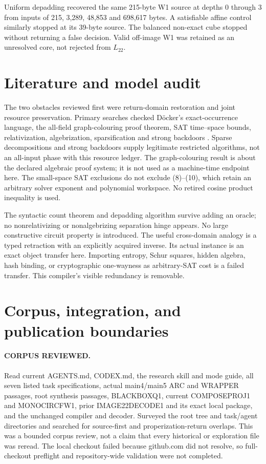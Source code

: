 \documentclass[11pt]{article}
\begin{document}
Uniform depadding recovered the same 215-byte W1 source at depths 0 through 3
from inputs of 215, 3,289, 48,853 and 698,617 bytes. A satisfiable affine
control similarly stopped at its 39-byte source. The balanced non-exact cube
stopped without returning a false decision. Valid off-image W1 was retained
as an unresolved core, not rejected from $L_{22}$.

\section{Literature and model audit}
The two obstacles reviewed first were return-domain restoration and joint
resource preservation. Primary searches checked D\"ocker's exact-occurrence
language, the all-field graph-colouring proof theorem, SAT time--space bounds,
relativization, algebrization, sparsification and strong backdoors
\cite{docker,colour,mw,bgs,aw,ipz,gs}. Sparse decompositions and strong
backdoors supply legitimate restricted algorithms, not an all-input phase
with this resource ledger. The graph-colouring result is about the declared
algebraic proof system; it is not used as a machine-time endpoint here.
The small-space SAT exclusions do not exclude (8)--(10), which retain an
arbitrary solver exponent and polynomial workspace. No retired cosine
product inequality is used.

The syntactic count theorem and depadding algorithm survive adding an oracle;
no nonrelativizing or nonalgebrizing separation hinge appears. No large
constructive circuit property is introduced. The useful cross-domain analogy
is a typed retraction with an explicitly acquired inverse. Its actual instance
is an exact object transfer here. Importing entropy, Schur squares, hidden
algebra, hash binding, or cryptographic one-wayness as arbitrary-SAT cost is
a failed transfer. This compiler's visible redundancy is removable.

\section{Corpus, integration, and publication boundaries}
\paragraph{CORPUS REVIEWED.}
Read current AGENTS.md, CODEX.md, the research skill and mode guide, all seven
listed task specifications, actual main4/main5 ARC and WRAPPER passages,
root synthesis passages, BLACKBOXQ1, current COMPOSEPROJ1 and MONOCIRCFW1,
prior IMAGE22DECODE1 and its exact local package, and the unchanged compiler
and decoder. Surveyed the root tree and task/agent directories and searched
for source-first and properization-return overlaps. This was a bounded
corpus review, not a claim that every historical or exploration file was
reread. The local checkout failed because github.com did not resolve, so
full-checkout preflight and repository-wide validation were not completed.
\end{document}
